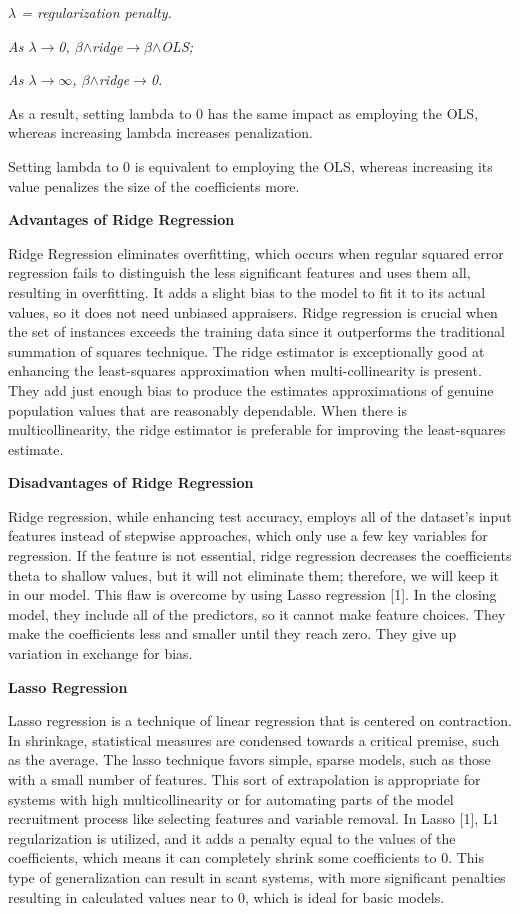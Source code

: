 \documentclass{article} %
\begin{document}
\noindent \textit{$\lambda$ = regularization penalty.}

\noindent \textit{As $\lambda$$\to$0, $\beta$$\wedge$ridge$\to$$\beta$$\wedge$OLS;}

\noindent \textit{As $\lambda$$\to$$\infty$, $\beta$$\wedge$ridge$\to$0.}

\noindent As a result, setting lambda to 0 has the same impact as employing the OLS, whereas increasing lambda increases penalization.

\noindent Setting lambda to 0 is equivalent to employing the OLS, whereas increasing its value penalizes the size of the coefficients more.

\noindent \textbf{Advantages of Ridge Regression}

\noindent Ridge Regression eliminates overfitting, which occurs when regular squared error regression fails to distinguish the less significant features and uses them all, resulting in overfitting. It adds a slight bias to the model to fit it to its actual values, so it does not need unbiased appraisers. Ridge regression is crucial when the set of instances exceeds the training data since it outperforms the traditional summation of squares technique. The ridge estimator is exceptionally good at enhancing the least-squares approximation when multi-collinearity is present. They add just enough bias to produce the estimates approximations of genuine population values that are reasonably dependable. When there is multicollinearity, the ridge estimator is preferable for improving the least-squares estimate.

\noindent \textbf{Disadvantages of Ridge Regression}

\noindent Ridge regression, while enhancing test accuracy, employs all of the dataset's input features instead of stepwise approaches, which only use a few key variables for regression. If the feature is not essential, ridge regression decreases the coefficients theta to shallow values, but it will not eliminate them; therefore, we will keep it in our model. This flaw is overcome by using Lasso regression [1]. In the closing model, they include all of the predictors, so it cannot make feature choices. They make the coefficients less and smaller until they reach zero. They give up variation in exchange for bias.

\noindent \textbf{Lasso Regression}

\noindent Lasso regression is a technique of linear regression that is centered on contraction. In shrinkage, statistical measures are condensed towards a critical premise, such as the average. The lasso technique favors simple, sparse models, such as those with a small number of features. This sort of extrapolation is appropriate for systems with high multicollinearity or for automating parts of the model recruitment process like selecting features and variable removal. In Lasso [1], L1 regularization is utilized, and it adds a penalty equal to the values of the coefficients, which means it can completely shrink some coefficients to 0. This type of generalization can result in scant systems, with more significant penalties resulting in calculated values near to 0, which is ideal for basic models.
\end{document}
